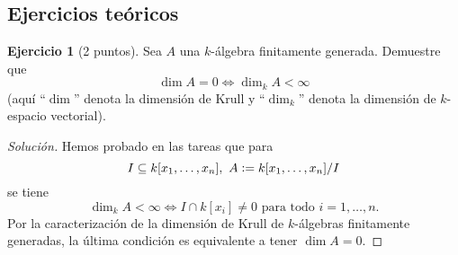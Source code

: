\documentclass{article}
\theoremstyle{definition}
\newtheorem{ejerc}{Ejercicio}
\newenvironment{solucion}{\begin{proof}[Solución]}{\end{proof}}
\begin{document}
\pagestyle{empty}


\subsection*{Ejercicios teóricos}

\begin{ejerc}[2 puntos]
  Sea $A$ una $k$-álgebra finitamente generada. Demuestre que
  $$\dim A = 0 \iff \dim_k A < \infty$$
  (aquí ``$\dim$'' denota la dimensión de Krull y ``$\dim_k$'' denota la
  dimensión de $k$-espacio vectorial).

  \ifdefined\solutions\begin{solucion}
    Hemos probado en las tareas que para
    $$I \subseteq k [x_1,\ldots,x_n], ~ A \mathrel{\mathop:}= k [x_1,\ldots,x_n]/I$$
    se tiene
    $$\dim_k A < \infty \iff I \cap k[x_i] \ne 0\text{ para todo }i = 1,\ldots,n.$$
    Por la caracterización de la dimensión de Krull de $k$-álgebras finitamente
    generadas, la última condición es equivalente a tener $\dim A = 0$.
  \end{solucion}\fi
\end{ejerc}
\end{document}
